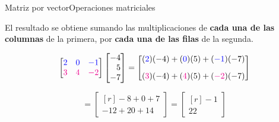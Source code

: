 \documentclass[spanish, c]{beamer}
\begin{document}
\begin{frame}{Matriz por vector}{Operaciones matriciales}    

    El resultado se obtiene sumando las multiplicaciones de \textbf{cada una de las columnas} de la primera, por \textbf{cada una de las filas} de la segunda.

    \[%
        \begin{bmatrix*}[r]
            {\color{blue} 2} & {\color{blue} 0} & {\color{blue} -1}\\
            {\color{magenta} 3} & {\color{magenta} 4} & {\color{magenta} -2}
        \end{bmatrix*}
        \begin{bmatrix*}[r]
            -4 \\
            5 \\
            -7
        \end{bmatrix*} =
        \begin{bmatrix*}[r]
            {({\color{blue} 2})}(-4) + {({\color{blue} 0})}(5) + {({\color{blue} -1})}(-7) \\[2ex]
            {({\color{magenta} 3})}(-4) + {({\color{magenta} 4})}(5) + {({\color{magenta} -2})}(-7)
        \end{bmatrix*}
    \]

    \bigskip

    \[%
        =
        \begin{bmatrix*}[r]
            -8 + 0 + 7 \\
            -12 + 20 +14
        \end{bmatrix*} =
        \begin{bmatrix*}[r]
            -1 \\
            22
        \end{bmatrix*}
    \]
\end{frame}
\end{document}
